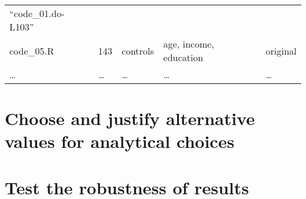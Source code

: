 \documentclass[]{book}
\begin{document}
\begin{longtable}[]{@{}lllll@{}}
\begin{minipage}[t]{0.18\columnwidth}
``code\_01.do-L103''\strut
\end{minipage}\tabularnewline
\begin{minipage}[t]{0.10\columnwidth}\raggedright
code\_05.R\strut
\end{minipage} & \begin{minipage}[t]{0.11\columnwidth}\raggedright
143\strut
\end{minipage} & \begin{minipage}[t]{0.18\columnwidth}\raggedright
controls\strut
\end{minipage} & \begin{minipage}[t]{0.28\columnwidth}\raggedright
age, income, education\strut
\end{minipage} & \begin{minipage}[t]{0.18\columnwidth}\raggedright
original\strut
\end{minipage}\tabularnewline
\begin{minipage}[t]{0.10\columnwidth}\raggedright
\ldots{}\strut
\end{minipage} & \begin{minipage}[t]{0.11\columnwidth}\raggedright
\ldots{}\strut
\end{minipage} & \begin{minipage}[t]{0.18\columnwidth}\raggedright
\ldots{}\strut
\end{minipage} & \begin{minipage}[t]{0.28\columnwidth}\raggedright
\ldots{}\strut
\end{minipage} & \begin{minipage}[t]{0.18\columnwidth}\raggedright
\ldots{}\strut
\end{minipage}\tabularnewline
\bottomrule
\end{longtable}

\hypertarget{choose-and-justify-alternative-values-for-analytical-choices}{%
\section{Choose and justify alternative values for analytical choices}\label{choose-and-justify-alternative-values-for-analytical-choices}}

\hypertarget{test-the-robustness-of-results}{%
\section{Test the robustness of results}\label{test-the-robustness-of-results}}
\end{document}
